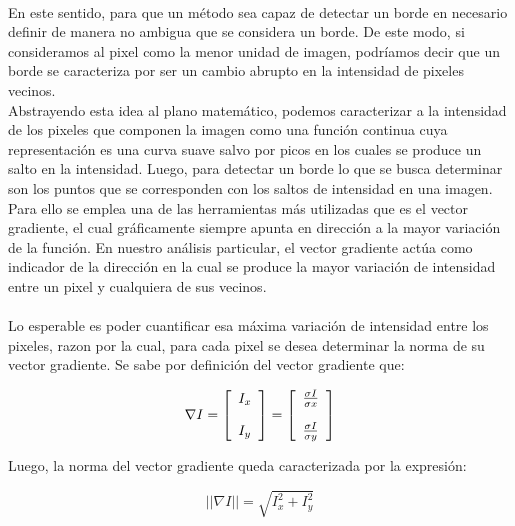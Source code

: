 \documentclass[11pt, a4paper]{article}
\begin{document}
\paragraph{}
En este sentido, para que un m\'etodo sea capaz de detectar un borde en necesario definir de manera no ambigua que se considera un borde. De este modo, si consideramos al pixel como la menor unidad de imagen, podr\'iamos decir que un borde se caracteriza por ser un cambio abrupto en la intensidad de pixeles vecinos.\\
Abstrayendo esta idea al plano matem\'atico, podemos caracterizar a la intensidad de los pixeles que componen la imagen como una funci\'on continua cuya representaci\'on es una curva suave salvo por picos en los cuales se produce un salto en la intensidad. Luego, para detectar un borde lo que se busca determinar son los puntos que se corresponden con los saltos de intensidad en una imagen.\\
Para ello se emplea una de las herramientas m\'as utilizadas que es el vector gradiente, el cual gr\'aficamente siempre apunta en direcci\'on a la mayor variaci\'on de la funci\'on. En nuestro an\'alisis particular, el vector gradiente act\'ua como indicador de la direcci\'on en la cual se produce la mayor variaci\'on de intensidad entre un pixel y cualquiera de sus vecinos.

\paragraph{}
Lo esperable es poder cuantificar esa m\'axima variaci\'on de intensidad entre los pixeles, razon por la cual, para cada pixel se desea determinar la norma de su vector gradiente. Se sabe por definici\'on del vector gradiente que:


$$
\nabla I = \left[ \begin{array}{l}
\vspace{11 pt}
I_x\\
I_y
\end{array}
\right]
= \left[ \begin{array}{l}
\vspace{11 pt}
\frac{\sigma I}{\sigma x}\\
\frac{\sigma I}{\sigma y}
\end{array}
\right]
$$



Luego, la norma del vector gradiente queda caracterizada por la expresi\'on:

\begin{equation}
||\nabla I|| = \sqrt{I_x ^{2}+ I_y^{2}}
\end{equation}
\end{document}
